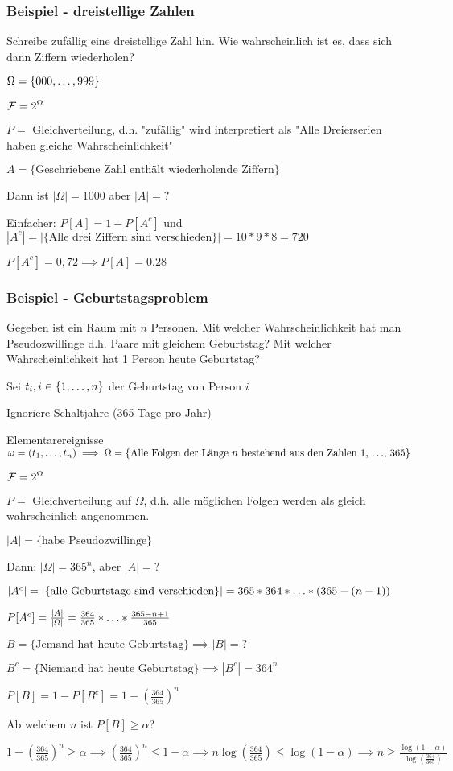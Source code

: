 \subsubsection{Beispiel - dreistellige Zahlen}
\enumstart
	\item Schreibe zufällig eine dreistellige Zahl hin. Wie wahrscheinlich ist es, dass sich dann Ziffern wiederholen?
	\item $\Omega = \{000, \mathellipsis, 999\}$
	\item $\mathcal{F} = 2^\Omega$
	\item $P =$ Gleichverteilung, d.h. "zufällig" wird interpretiert als "Alle Dreierserien haben gleiche Wahrscheinlichkeit"
	\item $A = \{\text{Geschriebene Zahl enthält wiederholende Ziffern}\}$
	\item Dann ist $|\Omega| = 1000$ aber $|A| = ?$
	\item Einfacher: $P[A] = 1 - P[A^c]$ und $|A^c| = |\{\text{Alle drei Ziffern sind verschieden}\}| = 10*9*8 = 720$
	\item $P[A^c] = 0,72 \implies P[A] = 0.28$
\enumend

\subsubsection{Beispiel - Geburtstagsproblem}
\enumstart
	\item Gegeben ist ein Raum mit $n$ Personen. Mit welcher Wahrscheinlichkeit hat man Pseudozwillinge d.h. Paare mit gleichem Geburtstag? Mit welcher Wahrscheinlichkeit hat 1 Person heute Geburtstag?
	\item Sei $t_i, i \in \{1, \mathellipsis, n\}$ der Geburtstag von Person $i$
	\item Ignoriere Schaltjahre (365 Tage pro Jahr)
	\item Elementarereignisse $\omega = (t_1, \mathellipsis, t_n) \implies \Omega = \{\text{Alle Folgen der Länge $n$ bestehend aus den Zahlen 1, $\mathellipsis$, 365}\}$
	\item $\mathcal{F} = 2^\Omega$
	\item $P =$ Gleichverteilung auf $\Omega$, d.h. alle möglichen Folgen werden als gleich wahrscheinlich angenommen.
	\item $|A| = \{\text{habe Pseudozwillinge}\}$
	\item Dann: $|\Omega| = 365^n$, aber $|A| = ?$
	\item $|A^c| = |\{\text{alle Geburtstage sind verschieden}\}| = 365*364*\mathellipsis*(365-(n-1))$
	\item $P[A^c] = \frac{|A|}{|\Omega|} = \frac{364}{365}*\mathellipsis*\frac{365-n+1}{365}$
	\item $B = \{\text{Jemand hat heute Geburtstag}\} \implies |B| = ?$
	\item $B^c = \{\text{Niemand hat heute Geburtstag}\} \implies |B^c| = 364^n$
	\item $P[B] = 1 - P[B^c] = 1 - (\frac{364}{365})^n$
	\item Ab welchem $n$ ist $P[B] \ge \alpha$?
	\item $1 - (\frac{364}{365})^n \ge \alpha \implies (\frac{364}{365})^n \le 1 - \alpha \implies n\log(\frac{364}{365}) \le \log(1 - \alpha) \implies n \ge \frac{\log(1 - \alpha)}{\log(\frac{364}{365})}$
\enumend

